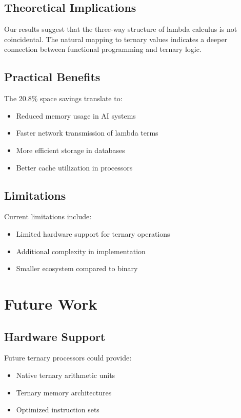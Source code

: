 \documentclass[11pt]{article}
\begin{document}
\subsection{Theoretical Implications}

Our results suggest that the three-way structure of lambda calculus is not coincidental. The natural mapping to ternary values indicates a deeper connection between functional programming and ternary logic.

\subsection{Practical Benefits}

The 20.8\% space savings translate to:
\begin{itemize}
    \item Reduced memory usage in AI systems
    \item Faster network transmission of lambda terms
    \item More efficient storage in databases
    \item Better cache utilization in processors
\end{itemize}

\subsection{Limitations}

Current limitations include:
\begin{itemize}
    \item Limited hardware support for ternary operations
    \item Additional complexity in implementation
    \item Smaller ecosystem compared to binary
\end{itemize}

\section{Future Work}

\subsection{Hardware Support}

Future ternary processors could provide:
\begin{itemize}
    \item Native ternary arithmetic units
    \item Ternary memory architectures
    \item Optimized instruction sets
\end{itemize}
\end{document}
